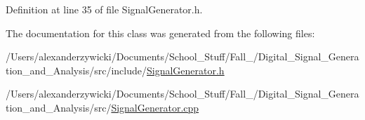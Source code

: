 Definition at line 35 of file Signal\+Generator.\+h.



The documentation for this class was generated from the following files\+:\begin{DoxyCompactItemize}
\item 
/\+Users/alexanderzywicki/\+Documents/\+School\+\_\+\+Stuff/\+Fall\+\_/\+Digital\+\_\+\+Signal\+\_\+\+Generation\+\_\+and\+\_\+\+Analysis/src/include/\hyperlink{_signal_generator_8h}{Signal\+Generator.\+h}\item 
/\+Users/alexanderzywicki/\+Documents/\+School\+\_\+\+Stuff/\+Fall\+\_/\+Digital\+\_\+\+Signal\+\_\+\+Generation\+\_\+and\+\_\+\+Analysis/src/\hyperlink{_signal_generator_8cpp}{Signal\+Generator.\+cpp}\end{DoxyCompactItemize}
